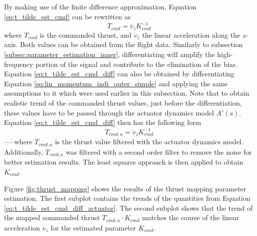 \documentclass[11pt, a4paper, twoside]{report}
\begin{document}
By making use of the finite difference approximation, Equation \ref{eq:t_tilde_est_cmd} can be rewritten as
\begin{equation}
	\dot{T}_{cmd} = \ddot{v}_{z} K_{cmd}^{-1}
	\label{eq:t_tilde_est_cmd_diff}
\end{equation}
where $T_{cmd}$ is the commanded thrust, and $\dot{v}_{z}$ the linear acceleration along the $z$-axis. Both values can be obtained from the flight data. Similarly to subsection \ref{subsec:parameter_estimation_inner}, differentiating will amplify the high-frequency portion of the signal and contribute to the elimination of the bias. Equation \ref{eq:t_tilde_est_cmd_diff} can also be obtained by differentiating Equation \ref{eq:lin_momentum_indi_outer_simple} and applying the same assumptions to it which were used earlier in this subsection. Note that to obtain realistic trend of the commanded thrust values, just before the differentiation, these values have to be passed through the actuator dynamics model $A'(s)$. Equation \ref{eq:t_tilde_est_cmd_diff} then has the following form 
\begin{equation}
	\dot{T}_{cmd, a} = \ddot{v}_{z} K_{cmd}^{-1}
	\label{eq:t_tilde_est_cmd_diff_actuator}
\end{equation}
–––where $T_{cmd, a}$ is the thrust value filtered with the actuator dynamics model. Additionally, $\dot{T}_{cmd, a}$ was filtered with a second order filter to remove the noise for better estimation results. The least squares approach is then applied to obtain $K_{cmd}$.

Figure \ref{fig:thrust_mapping} shows the results of the thrust mapping parameter estimation. The first subplot contains the trends of the quantities from Equation \ref{eq:t_tilde_est_cmd_diff_actuator}. The second subplot shows that the trend of the mapped commanded thrust $T_{cmd, a} \cdot K_{cmd}$ matches the course of the linear acceleration $\dot{v}_{z}$ for the estimated parameter $K_{cmd}$.
 
\end{document}
